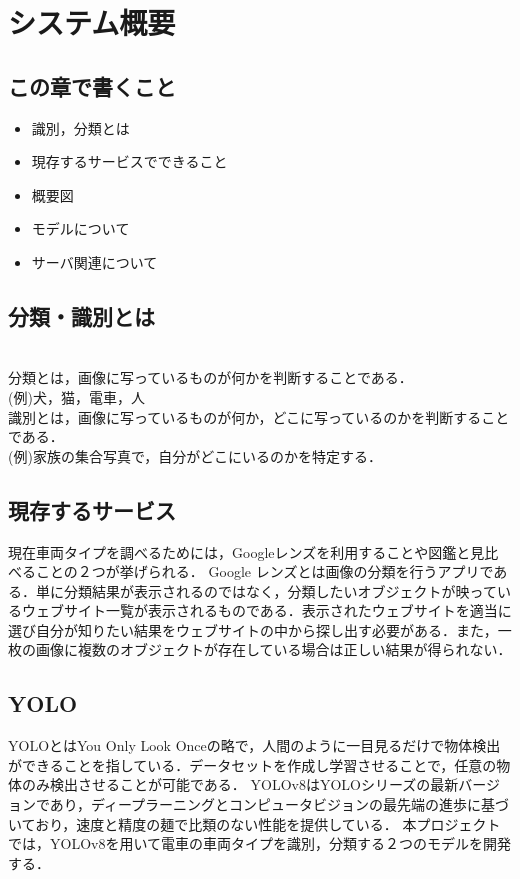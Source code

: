 

\chapter{システム概要}
\section{この章で書くこと}
\begin{itemize}
	\item 識別，分類とは
	\item 現存するサービスでできること
	\item 概要図
	\item モデルについて
	\item サーバ関連について
\end{itemize}
\section{分類・識別とは}
\\
分類とは，画像に写っているものが何かを判断することである．\\
(例)犬，猫，電車，人\\
識別とは，画像に写っているものが何か，どこに写っているのかを判断することである．\\
(例)家族の集合写真で，自分がどこにいるのかを特定する．

\section{現存するサービス}
現在車両タイプを調べるためには，Googleレンズを利用することや図鑑と見比べることの２つが挙げられる．
Google レンズとは画像の分類を行うアプリである．単に分類結果が表示されるのではなく，分類したいオブジェクトが映っているウェブサイト一覧が表示されるものである．表示されたウェブサイトを適当に選び自分が知りたい結果をウェブサイトの中から探し出す必要がある．また，一枚の画像に複数のオブジェクトが存在している場合は正しい結果が得られない．


\section{YOLO}
YOLOとはYou Only Look Onceの略で，人間のように一目見るだけで物体検出ができることを指している．データセットを作成し学習させることで，任意の物体のみ検出させることが可能である．
YOLOv8はYOLOシリーズの最新バージョンであり，ディープラーニングとコンピュータビジョンの最先端の進歩に基づいており，速度と精度の麺で比類のない性能を提供している．
本プロジェクトでは，YOLOv8を用いて電車の車両タイプを識別，分類する２つのモデルを開発する．

